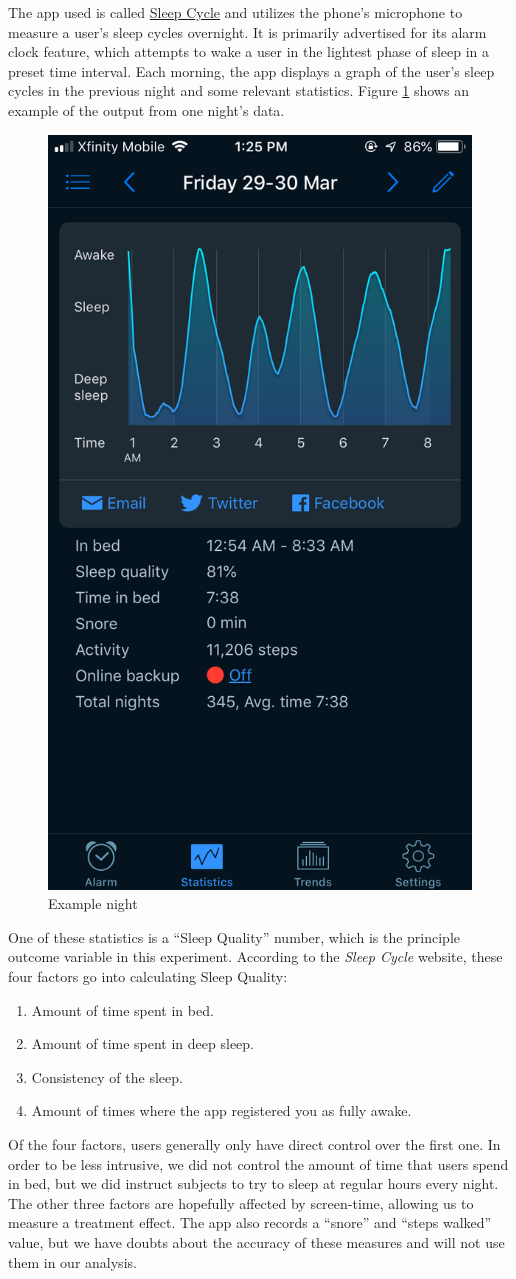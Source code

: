 \documentclass[12pt,]{article}
\providecommand{\tightlist}{%
  \setlength{\itemsep}{0pt}\setlength{\parskip}{0pt}}
\begin{document}
The app used is called \href{www.sleepcycle.com}{Sleep Cycle} and
utilizes the phone's microphone to measure a user's sleep cycles
overnight. It is primarily advertised for its alarm clock feature, which
attempts to wake a user in the lightest phase of sleep in a preset time
interval. Each morning, the app displays a graph of the user's sleep
cycles in the previous night and some relevant statistics. Figure
\ref{fig:example_night} shows an example of the output from one night's
data.

\begin{figure}[H]

{\centering \includegraphics[width=0.25\linewidth]{img/example_night} 

}

\caption{Example night}\label{fig:example_night}
\end{figure}

One of these statistics is a ``Sleep Quality'' number, which is the
principle outcome variable in this experiment. According to the
\emph{Sleep Cycle} website, these four factors go into calculating Sleep
Quality:

\begin{enumerate}
\def\labelenumi{\arabic{enumi}.}
\tightlist
\item
  Amount of time spent in bed.
\item
  Amount of time spent in deep sleep.
\item
  Consistency of the sleep.
\item
  Amount of times where the app registered you as fully awake.
\end{enumerate}

Of the four factors, users generally only have direct control over the
first one. In order to be less intrusive, we did not control the amount
of time that users spend in bed, but we did instruct subjects to try to
sleep at regular hours every night. The other three factors are
hopefully affected by screen-time, allowing us to measure a treatment
effect. The app also records a ``snore'' and ``steps walked'' value, but
we have doubts about the accuracy of these measures and will not use
them in our analysis.
\end{document}
